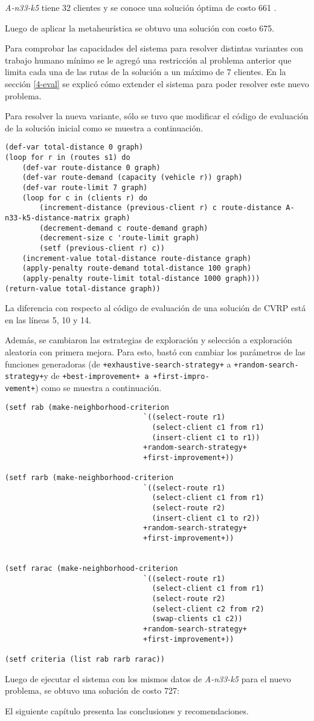 \textit{A-n33-k5} tiene 32 clientes y se conoce una solución óptima de costo 661 \cite{Data}.

Luego de aplicar la metaheurística se obtuvo una solución con costo 675.

Para comprobar las capacidades del sistema para resolver distintas variantes con trabajo humano mínimo se le agregó una restricción al problema anterior que limita cada una de las rutas de la solución a un máximo de 7 clientes. En la sección \ref{4-eval} se explicó cómo extender el sistema para poder resolver este nuevo problema.

Para resolver la nueva variante, sólo se tuvo que modificar el código de evaluación de la solución inicial como se muestra a continuación.

\begin{lstlisting}
(def-var total-distance 0 graph)
(loop for r in (routes s1) do
	(def-var route-distance 0 graph)
	(def-var route-demand (capacity (vehicle r)) graph) 
	(def-var route-limit 7 graph)
	(loop for c in (clients r) do
		(increment-distance (previous-client r) c route-distance A-n33-k5-distance-matrix graph)
		(decrement-demand c route-demand graph) 
		(decrement-size c 'route-limit graph) 
		(setf (previous-client r) c))
	(increment-value total-distance route-distance graph)
	(apply-penalty route-demand total-distance 100 graph) 
	(apply-penalty route-limit total-distance 1000 graph))) 
(return-value total-distance graph))
\end{lstlisting}

La diferencia con respecto al código de evaluación de una solución de CVRP está en las líneas 5, 10 y 14.

Además, se cambiaron las estrategias de exploración y selección a exploración aleatoria con primera mejora. Para esto, bastó con cambiar los parámetros de las funciones generadoras (de \texttt{+exhaustive-search-strategy+} a \texttt{+random-search-strategy+}y de \texttt{+best-improvement+ a \texttt{+first-impro-\\vement+}}) como se muestra a continuación.

\begin{lstlisting}
(setf rab (make-neighborhood-criterion 
								`((select-route r1)
								  (select-client c1 from r1)
								  (insert-client c1 to r1))
								+random-search-strategy+ 
								+first-improvement+))

(setf rarb (make-neighborhood-criterion 
								`((select-route r1)
								  (select-client c1 from r1)
								  (select-route r2)
								  (insert-client c1 to r2))
								+random-search-strategy+ 
								+first-improvement+))


(setf rarac (make-neighborhood-criterion 
								`((select-route r1)
								  (select-client c1 from r1)
								  (select-route r2)
								  (select-client c2 from r2)
								  (swap-clients c1 c2))
								+random-search-strategy+ 
								+first-improvement+))

(setf criteria (list rab rarb rarac))

\end{lstlisting}

Luego de ejecutar el sistema con los mismos datos de \textit{A-n33-k5} para el nuevo problema, se obtuvo una solución de costo 727:

El siguiente capítulo presenta las conclusiones y recomendaciones.